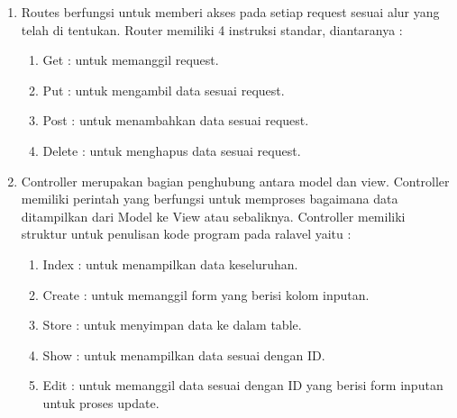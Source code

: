 \begin{enumerate}

\item Routes berfungsi untuk memberi akses pada setiap request sesuai alur yang telah di tentukan. Router memiliki 4 instruksi standar, diantaranya :

\begin{enumerate}

\item Get	\hspace{0.47cm}: untuk memanggil request.

\item Put	\hspace{0.51cm}: untuk mengambil data sesuai request.

\item Post	\hspace{0.5cm}: untuk menambahkan data sesuai request.

\item Delete \hspace{0.12cm}: untuk menghapus data sesuai request.
\end{enumerate}

\item Controller merupakan bagian penghubung antara model dan view. Controller memiliki perintah yang berfungsi untuk memproses bagaimana data ditampilkan dari Model ke View atau sebaliknya. Controller memiliki struktur untuk penulisan kode program pada ralavel yaitu :

\begin{enumerate}

\item Index	\hspace{0.34cm}: untuk menampilkan data keseluruhan.

\item Create \hspace{0.2cm}: untuk memanggil form yang berisi kolom inputan.

\item Store	\hspace{0.4cm}: untuk menyimpan data ke dalam table.

\item Show	\hspace{0.35cm}: untuk menampilkan data sesuai dengan ID.

\item Edit	\hspace{0.57cm}: untuk memanggil data sesuai dengan ID yang berisi form    inputan untuk proses update.


\end{enumerate}
\end{enumerate}
